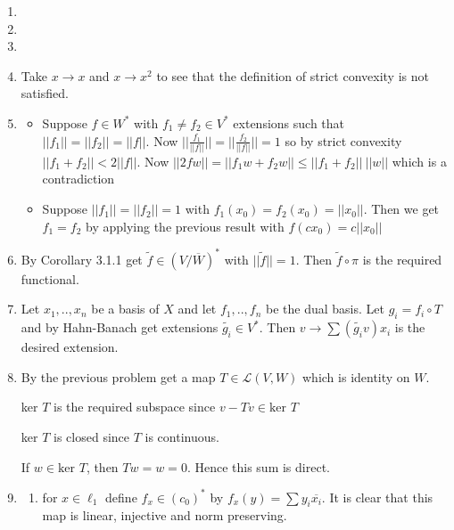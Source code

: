 \documentclass{article}
\begin{document}
\begin{enumerate}
    \item 
    \item 
    \item 
    
    \item Take $x \to x$ and $x \to x^2$ to see that the definition of strict convexity is not satisfied.
    
    \item \begin{itemize}
        \item     Suppose $f \in W^*$ with $f_1 \neq f_2 \in V^*$ extensions such that $||f_1||=||f_2||=||f||$. Now $||\frac{f_1}{||f||}||=||\frac{f_2}{||f||}||=1$ so by strict convexity $||f_1+f_2||<2||f||$. Now $||2fw||=||f_1w+f_2w|| \leq ||f_1+f_2|| \ ||w||$ which is a contradiction

        \item     Suppose $||f_1||=||f_2||=1$ with $f_1(x_0)=f_2(x_0)=||x_0||$. Then we get $f_1=f_2$ by applying the previous result with $f(cx_0)=c||x_0||$
    \end{itemize}

    \item By Corollary 3.1.1 get $\tilde{f} \in (V/\overline{W})^*$ with $||\tilde{f}||=1$. Then $\tilde{f} \circ \pi$ is the required functional.

    \item Let $x_1,..,x_n$ be a basis of $X$ and let $f_1,..,f_n$ be the dual basis. Let $g_i=f_i \circ T$ and by Hahn-Banach get extensions $\tilde{g_i} \in V^*$. Then $v \to \sum (\tilde{g_i}v)x_i$ is the desired extension.

    \item By the previous problem get a map $T \in \mathcal{L}(V,W)$ which is identity on $W$. 
    
    
    ker $T$ is the required subspace since $v-Tv \in \text{ker }T$ 

    ker $T$ is closed since $T$ is continuous.

    If $w \in \text{ker }T$, then $Tw=w=0$. Hence this sum is direct.

    \item \begin{enumerate}
        
        \item for $x \in \ell_1$ define $f_x \in (c_0)^*$ by $f_x(y)=\sum y_i\overline{x_i}$. It is clear that this map is linear, injective and norm preserving.


\end{enumerate}
\end{enumerate}
\end{document}

